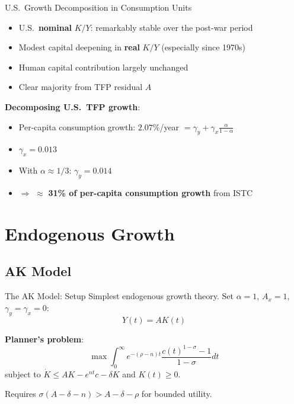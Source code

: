 \documentclass[blue]{beamer}
\begin{document}
\begin{frame}{U.S.\ Growth Decomposition in Consumption Units}

	\begin{itemize}
		\item U.S.\ \textbf{nominal} $K/Y$: remarkably stable over the post-war period
		\item Modest capital deepening in \textbf{real} $K/Y$ (especially since 1970s)
		\item Human capital contribution largely unchanged
		\item Clear majority from TFP residual $A$
	\end{itemize}
	\bigskip
	\textbf{Decomposing U.S.\ TFP growth}:
	\begin{itemize}
		\item Per-capita consumption growth: $2.07\%$/year $= \gamma_y + \gamma_x \frac{\alpha}{1-\alpha}$
		\item $\gamma_x = 0.013$
		\item With $\alpha \approx 1/3$: $\gamma_y = 0.014$
		\item $\Rightarrow$ $\approx$ \textbf{31\% of per-capita consumption growth} from ISTC
	\end{itemize}
	\end{frame}
	
\section{Endogenous Growth}

\subsection{AK Model}

\begin{frame}{The AK Model: Setup}
	Simplest endogenous growth theory. Set $\alpha = 1$, $A_x = 1$, $\gamma_y = \gamma_x = 0$:
	\[
	Y(t) = AK(t)
	\]
	
	\textbf{Planner's problem}:
	\[
	\max \int_0^\infty e^{-(\rho-n)t} \frac{c(t)^{1-\sigma}-1}{1-\sigma}dt 
	\]
	subject to $\dot{K} \leq AK - e^{nt} c - \delta K$ and $K(t) \geq 0$.
	
	\bigskip
	Requires $\sigma(A - \delta - n) > A - \delta - \rho$ for bounded utility.
\end{frame}
	
\end{document}

